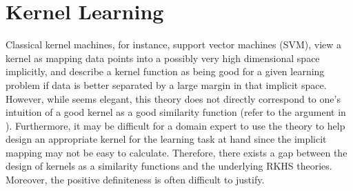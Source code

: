 


\section{Kernel Learning}

Classical kernel machines, for instance, support vector machines (SVM), view a kernel as mapping data points into a possibly very high dimensional space implicitly, and describe a kernel function as being good for a given learning problem if data is better separated by a large margin in that implicit space. However, while seems elegant, this theory does not directly correspond to one's intuition of a good kernel as a good similarity function (refer to the argument in \cite{stoc/BalcanBV08}). Furthermore, it may be difficult for a domain expert to use the theory to help design an appropriate kernel for the learning task at hand since the implicit mapping may not be easy to calculate. Therefore, there exists a gap between the design of kernels as a similarity functions and the underlying RKHS theories. Moreover, the positive definiteness is often difficult to justify.

